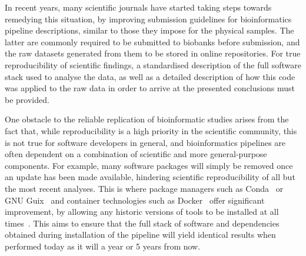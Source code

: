 \begin{justify}
In recent years, many scientific journals have started taking steps towards remedying this situation, by improving submission guidelines for bioinformatics pipeline descriptions, similar to those they impose for the physical samples.
The latter are commonly required to be submitted to biobanks before submission, and the raw datasets generated from them to be stored in online repositories.
For true reproducibility of scientific findings, a standardised description of the full software stack used to analyse the data, as well as a detailed description of how this code was applied to the raw data in order to arrive at the presented conclusions must be provided.

One obstacle to the reliable replication of bioinformatic studies arises from the fact that, while reproducibility is a high priority in the scientific community, this is not true for software developers in general, and bioinformatics pipelines are often dependent on a combination of scientific and more general-purpose components. For example, many software packages will simply be removed once an update has been made available, hindering scientific reproducibility of all but the most recent analyses. This is where package managers such as Conda~\cite{conda} or GNU Guix~\cite{courtes2013functional} and container technologies such as Docker~\cite{url-docker} offer significant improvement, by allowing any historic versions of tools to be installed at all times~\cite{kulkarni2018reproducible}. This aims to ensure that the full stack of software and dependencies obtained during installation of the pipeline will yield identical results when performed today as it will a year or 5 years from now.


\end{justify}
